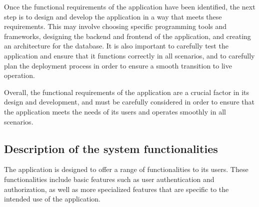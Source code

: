 \documentclass[singlespacing,12pt,parskip,headsepline,consistentlayout]{article}
\begin{document}
Once the functional requirements of the application have been identified, the next step is to design and develop the application in a way that meets these requirements. This may involve choosing specific programming tools and frameworks, designing the backend and frontend of the application, and creating an architecture for the database. It is also important to carefully test the application and ensure that it functions correctly in all scenarios, and to carefully plan the deployment process in order to ensure a smooth transition to live operation.

Overall, the functional requirements of the application are a crucial factor in its design and development, and must be carefully considered in order to ensure that the application meets the needs of its users and operates smoothly in all scenarios.

\subsection{Description of the system functionalities}

The application is designed to offer a range of functionalities to its users. These functionalities include basic features such as user authentication and authorization, as well as more specialized features that are specific to the intended use of the application.

\pagebreak
\end{document}
